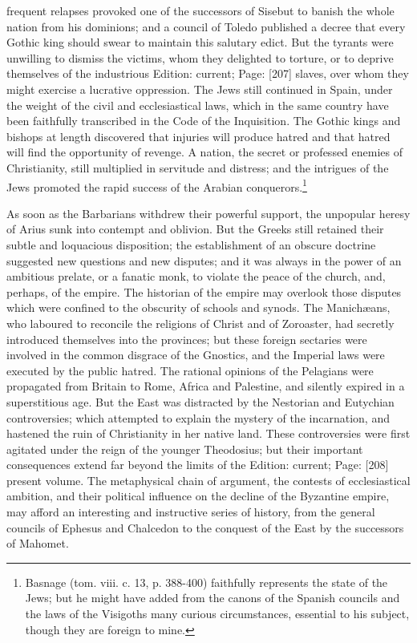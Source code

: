 frequent relapses provoked one of the successors of Sisebut to banish the whole nation from his dominions; and a council of Toledo published a decree that every Gothic king should swear to maintain this salutary edict. But the tyrants were unwilling to dismiss the victims, whom they delighted to torture, or to deprive themselves of the industrious Edition: current; Page: [207] slaves, over whom they might exercise a lucrative oppression. The Jews still continued in Spain, under the weight of the civil and ecclesiastical laws, which in the same country have been faithfully transcribed in the Code of the Inquisition. The Gothic kings and bishops at length discovered that injuries will produce hatred and that hatred will find the opportunity of revenge. A nation, the secret or professed enemies of Christianity, still multiplied in servitude and distress; and the intrigues of the Jews promoted the rapid success of the Arabian conquerors.\footnote{Basnage (tom. viii. c. 13, p. 388-400) faithfully represents the state of the Jews; but he might have added from the canons of the Spanish councils and the laws of the Visigoths many curious circumstances, essential to his subject, though they are foreign to mine.}

As soon as the Barbarians withdrew their powerful support, the unpopular heresy of Arius sunk into contempt and oblivion. But the Greeks still retained their subtle and loquacious disposition; the establishment of an obscure doctrine suggested new questions and new disputes; and it was always in the power of an ambitious prelate, or a fanatic monk, to violate the peace of the church, and, perhaps, of the empire. The historian of the empire may overlook those disputes which were confined to the obscurity of schools and synods. The Manichæans, who laboured to reconcile the religions of Christ and of Zoroaster, had secretly introduced themselves into the provinces; but these foreign sectaries were involved in the common disgrace of the Gnostics, and the Imperial laws were executed by the public hatred. The rational opinions of the Pelagians were propagated from Britain to Rome, Africa and Palestine, and silently expired in a superstitious age. But the East was distracted by the Nestorian and Eutychian controversies; which attempted to explain the mystery of the incarnation, and hastened the ruin of Christianity in her native land. These controversies were first agitated under the reign of the younger Theodosius; but their important consequences extend far beyond the limits of the Edition: current; Page: [208] present volume. The metaphysical chain of argument, the contests of ecclesiastical ambition, and their political influence on the decline of the Byzantine empire, may afford an interesting and instructive series of history, from the general councils of Ephesus and Chalcedon to the conquest of the East by the successors of Mahomet.

